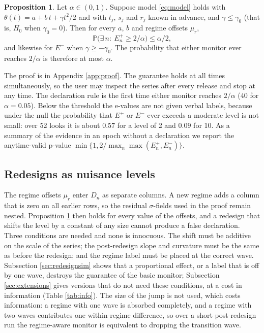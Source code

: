 \documentclass[Afour,sageh,times]{sagej}
\theoremstyle{definition}
\newtheorem{proposition}{Proposition}
\newcommand{\Prob}{\mathbb{P}}
\begin{document}
\begin{proposition}
\label{prop:valid}
Let $\alpha \in (0,1)$. Suppose model \eqref{eq:model} holds with $\theta(t) = a + b\,t + \gamma t^2/2$ and with $t_j$, $s_j$ and $r_j$ known in advance, and $\gamma \le \gamma_0$ (that is, $H_0$ when $\gamma_0 = 0$). Then for every $a$, $b$ and regime offsets $\mu_r$,
\[
\Prob\big(\exists\, n:\ E_n^{+} \ge 2/\alpha\big) \le \alpha/2,
\]
and likewise for $E^{-}$ when $\gamma \ge -\gamma_0$. The probability that either monitor ever reaches $2/\alpha$ is therefore at most $\alpha$.
\end{proposition}

The proof is in Appendix \ref{app:proof}. The guarantee holds at all times simultaneously, so the user may inspect the series after every release and stop at any time. The declaration rule is the first time either monitor reaches $2/\alpha$ ($40$ for $\alpha = 0.05$). Below the threshold the e-values are not given verbal labels, because under the null the probability that $E^{+}$ or $E^{-}$ ever exceeds a moderate level is not small: over 52 looks it is about $0.57$ for a level of 2 and $0.09$ for 10. As a summary of the evidence in an epoch without a declaration we report the anytime-valid p-value $\min\{1, 2/\max_n \max(E_n^{+}, E_n^{-})\}$.

\subsection{Redesigns as nuisance levels}
\label{sec:redesign}

The regime offsets $\mu_r$ enter $D_n$ as separate columns. A new regime adds a column that is zero on all earlier rows, so the residual $\sigma$-fields used in the proof remain nested. Proposition \ref{prop:valid} then holds for every value of the offsets, and a redesign that shifts the level by a constant of any size cannot produce a false declaration. Three conditions are needed and none is innocuous. The shift must be additive on the scale of the series; the post-redesign slope and curvature must be the same as before the redesign; and the regime label must be placed at the correct wave. Subsection \ref{sec:redesignsim} shows that a proportional effect, or a label that is off by one wave, destroys the guarantee of the basic monitor; Subsection \ref{sec:extensions} gives versions that do not need these conditions, at a cost in information (Table \ref{tab:info}). The size of the jump is not used, which costs information: a regime with one wave is absorbed completely, and a regime with two waves contributes one within-regime difference, so over a short post-redesign run the regime-aware monitor is equivalent to dropping the transition wave.
\end{document}
